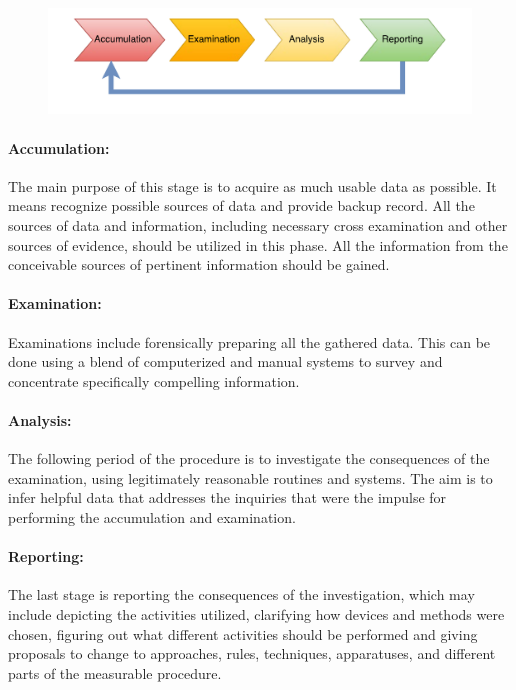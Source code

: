 \begin{figure}[h]
	\begin{center} 
	\includegraphics[width=1.0\textwidth]{img/general_methodology.pdf}
	\end{center}
	\caption{}
\end{figure}

\paragraph{Accumulation:} 
The main purpose of this stage is to acquire as much usable data as possible. It means recognize possible sources of data and provide backup record. All the sources of data and information, including necessary cross examination and other sources of evidence, should be utilized in this phase. All the information from the conceivable sources of pertinent information should be gained.

\paragraph{Examination:}
Examinations include forensically preparing all the gathered data. This can be done using a blend of computerized and manual systems to survey and concentrate specifically compelling information. 

\paragraph{Analysis:}
The following period of the procedure is to investigate the consequences of the examination, using legitimately reasonable routines and systems. The aim is to infer helpful data that addresses the inquiries that were the impulse for performing the accumulation and examination. 


\paragraph{Reporting:}
The last stage is reporting the consequences of the investigation, which may include depicting the activities utilized, clarifying how devices and methods were chosen, figuring out what different activities should be performed and giving proposals to change to approaches, rules, techniques, apparatuses, and different parts of the measurable procedure. 


